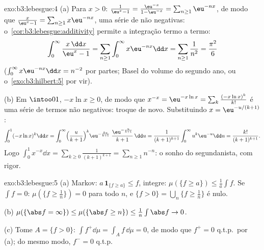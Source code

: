\begin{solution}{exo:b3:lebesgue:4}
(a) Para $x > 0$: $\frac1{\eu^x - 1} = \frac{\eu^{-x}}{1 -
\eu^{-x}} = \sum_{n\geq1}\eu^{-nx}$, de modo que $\frac{x}{\eu^x - 1} =
\sum_{n\geq1}x\eu^{-nx}$, uma série de 
não negativas: o~\cref{cor:b3:lebesgue:additivity} permite a integração
termo a termo:
\[
\int_0^\infty\frac{x\,\dd x}{\eu^x - 1}
= \sum_{n\geq1}\int_0^\infty x\eu^{-nx}\dd x
= \sum_{n\geq1}\frac1{n^2} = \frac{\pi^2}6
\]
($\int_0^\infty x\eu^{-nx}\dd x = n^{-2}$ por partes; Basel do
volume do segundo ano, ou o~\cref{exo:b3:hilbert:5} por vir).

(b) Em $\intoo01$, $-x\ln x \geq 0$, de modo que $x^{-x} =
\eu^{-x\ln x} = \sum_k\frac{(-x\ln x)^k}{k!}$ é uma série de
termos não negativos: troque de novo. Substituindo $x =
\eu^{-u/(k+1)}$:
\[
\int_0^1(-x\ln x)^k\dd x
= \int_0^\infty\Bigl(\frac{u}{k+1}\Bigr)^{k}
\eu^{-\frac{ku}{k+1}}\;\frac{\eu^{-\frac u{k+1}}}{k+1}\,\dd u
= \frac{1}{(k+1)^{k+1}}\int_0^\infty u^k\eu^{-u}\dd u
= \frac{k!}{(k+1)^{k+1}} .
\]
Logo $\int_0^1x^{-x}\dd x = \sum_{k\geq0}\frac{1}{(k+1)^{k+1}}
= \sum_{n\geq1}n^{-n}$: o sonho do segundanista, com rigor.
\end{solution}

\begin{solution}{exo:b3:lebesgue:5}
(a) Markov: $a\,\mathbf 1_{\{f \geq a\}} \leq f$, integre:
$\mu(\{f \geq a\}) \leq \frac1a\int f$. Se $\int f = 0$:
$\mu(\{f \geq \frac1n\}) = 0$ para todo $n$, e $\{f > 0\} =
\bigcup_n\{f \geq \frac1n\}$ é nulo.

(b) $\mu(\{\abs f = \infty\}) \leq \mu(\{\abs f \geq n\}) \leq
\frac1n\int\abs f \to 0$.

(c) Tome $A = \{f > 0\}$: $\int f^+\dd\mu = \int_Af\,\dd\mu =
0$, de modo que $f^+ = 0$ q.t.p.\ por (a); do mesmo modo, $f^- = 0$ q.t.p.
\end{solution}

